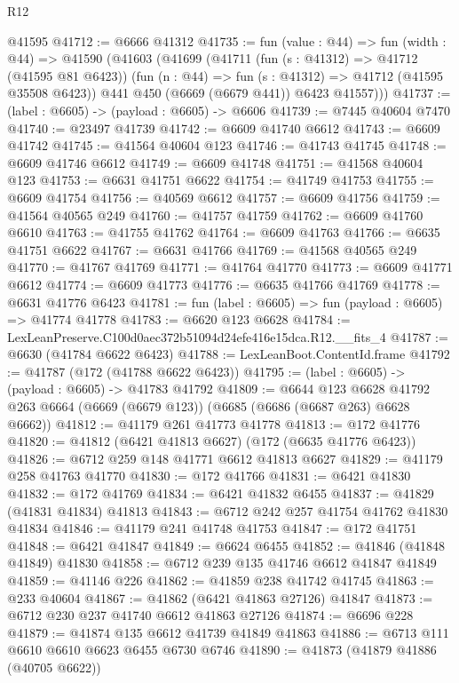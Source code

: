 \begin{lexlean}{R12}
\begin{coremodule}
    @41595
@41712 := @6666 @41312
@41735 := fun (value : @44) =>
  fun (width : @44) =>
  @41590
    (@41603
      (@41699
        (@41711
          (fun (s : @41312) => @41712 (@41595 @81 @6423))
          (fun (n : @44) => fun (s : @41312) => @41712 (@41595 @35508 @6423))
          @441
          @450
          (@6669 (@6679 @441))
          @6423
          @41557)))
@41737 := (label : @6605) -> (payload : @6605) -> @6606
@41739 := @7445 @40604 @7470
@41740 := @23497 @41739
@41742 := @6609 @41740 @6612
@41743 := @6609 @41742
@41745 := @41564 @40604 @123
@41746 := @41743 @41745
@41748 := @6609 @41746 @6612
@41749 := @6609 @41748
@41751 := @41568 @40604 @123
@41753 := @6631 @41751 @6622
@41754 := @41749 @41753
@41755 := @6609 @41754
@41756 := @40569 @6612
@41757 := @6609 @41756
@41759 := @41564 @40565 @249
@41760 := @41757 @41759
@41762 := @6609 @41760 @6610
@41763 := @41755 @41762
@41764 := @6609 @41763
@41766 := @6635 @41751 @6622
@41767 := @6631 @41766
@41769 := @41568 @40565 @249
@41770 := @41767 @41769
@41771 := @41764 @41770
@41773 := @6609 @41771 @6612
@41774 := @6609 @41773
@41776 := @6635 @41766 @41769
@41778 := @6631 @41776 @6423
@41781 := fun (label : @6605) => fun (payload : @6605) => @41774 @41778
@41783 := @6620 @123 @6628
@41784 := LexLeanPreserve.C100d0aec372b51094d24efe416e15dca.R12.__fits_4
@41787 := @6630 (@41784 @6622 @6423)
@41788 := LexLeanBoot.ContentId.frame
@41792 := @41787 (@172 (@41788 @6622 @6423))
@41795 := (label : @6605) -> (payload : @6605) -> @41783 @41792
@41809 := @6644
    @123
    @6628
    @41792
    @263
    @6664
    (@6669 (@6679 @123))
    (@6685 (@6686 (@6687 @263) @6628 @6662))
@41812 := @41179 @261 @41773 @41778
@41813 := @172 @41776
@41820 := @41812 (@6421 @41813 @6627) (@172 (@6635 @41776 @6423))
@41826 := @6712 @259 @148 @41771 @6612 @41813 @6627
@41829 := @41179 @258 @41763 @41770
@41830 := @172 @41766
@41831 := @6421 @41830
@41832 := @172 @41769
@41834 := @6421 @41832 @6455
@41837 := @41829 (@41831 @41834) @41813
@41843 := @6712 @242 @257 @41754 @41762 @41830 @41834
@41846 := @41179 @241 @41748 @41753
@41847 := @172 @41751
@41848 := @6421 @41847
@41849 := @6624 @6455
@41852 := @41846 (@41848 @41849) @41830
@41858 := @6712 @239 @135 @41746 @6612 @41847 @41849
@41859 := @41146 @226
@41862 := @41859 @238 @41742 @41745
@41863 := @233 @40604
@41867 := @41862 (@6421 @41863 @27126) @41847
@41873 := @6712 @230 @237 @41740 @6612 @41863 @27126
@41874 := @6696 @228
@41879 := @41874 @135 @6612 @41739 @41849 @41863
@41886 := @6713 @111 @6610 @6610 @6623 @6455 @6730 @6746
@41890 := @41873 (@41879 @41886 (@40705 @6622))

\end{coremodule}
\end{lexlean}
